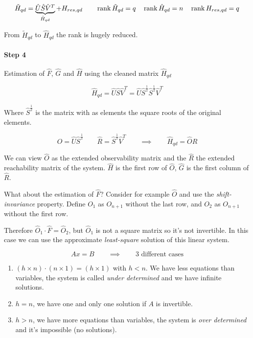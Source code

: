 \[
    \tilde{H}_{qd} = \underbrace{\hat{U} \hat{S} \hat{V}^T}_{\hat{H}_{qd}} + H_{res,qd} \qquad \operatorname{rank} \tilde{H}_{qd} = q \quad \operatorname{rank} \hat{H}_{qd} = n \quad \operatorname{rank} H_{res,qd} = q
\]

From $\tilde{H}_{qd}$ to $\hat{H}_{qd}$ the rank is hugely reduced.

\paragraph{Step 4} Estimation of $\hat{F}$, $\hat{G}$ and $\hat{H}$ using the cleaned matrix $\hat{H}_{qd}$

\[
    \hat{H}_{qd} = \hat{U} \hat{S} \hat{V}^T = \hat{U} \hat{S}^{\frac{1}{2}} \hat{S}^{\frac{1}{2}} \hat{V}^T
\]

Where $\hat{S}^{\frac{1}{2}}$ is the matrix with as elements the square roots of the original elements.

\[
    \hat{O} = \hat{U} \hat{S}^{\frac{1}{2}} \qquad \hat{R} = \hat{S}^{\frac{1}{2}} \hat{V}^T \qquad \implies \qquad \hat{H}_{qd} = \hat{O} \hat{R}
\]

We can view $\hat{O}$ as the extended observability matrix and the $\hat{R}$ the extended reachability matrix of the system. $\hat{H}$ is the first row of $\hat{O}$, $\hat{G}$ is the first column of $\hat{R}$.

What about the estimation of $\hat{F}$?
Consider for example $\hat{O}$ and use the \emph{shift-invariance} property.
Define $O_1$ as $O_{n+1}$ without the last row, and $O_2$ as $O_{n+1}$ without the first row.

Therefore $\hat{O}_1\cdot \hat{F} = \hat{O}_2$, but $\hat{O}_1$ is not a square matrix so it's not invertible.
In this case we can use the approximate \emph{least-square} solution of this linear system.

\[ Ax = B \qquad \implies \qquad \text{3 different cases} \]

\begin{enumerate}
    \item $(h\times n) \cdot (n \times 1) = (h \times 1)$ with $h < n$. We have less equations than variables, the system is called \emph{under determined} and we have infinite solutions.
    \item $h = n$, we have one and only one solution if $A$ is invertible.
    \item $h > n$, we have more equations than variables, the system is \emph{over determined} and it's impossible (no solutions).
\end{enumerate}

